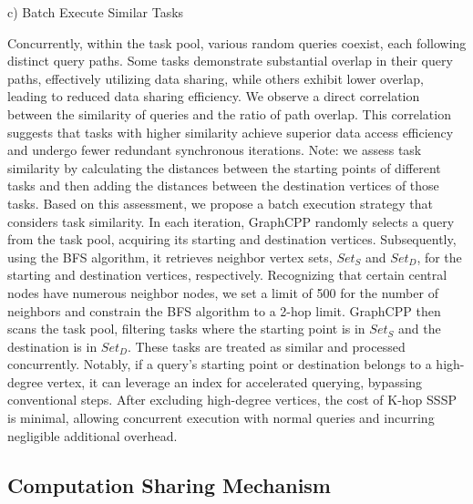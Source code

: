 \documentclass[lettersize,journal]{IEEEtran} %
\begin{document}
c) Batch Execute Similar Tasks

Concurrently, within the task pool, various random queries coexist, each following distinct query paths. Some tasks demonstrate substantial overlap in their query paths, effectively utilizing data sharing, while others exhibit lower overlap, leading to reduced data sharing efficiency. We observe a direct correlation between the similarity of queries and the ratio of path overlap. This correlation suggests that tasks with higher similarity achieve superior data access efficiency and undergo fewer redundant synchronous iterations. Note: we assess task similarity by calculating the distances between the starting points of different tasks and then adding the distances between the destination vertices of those tasks. Based on this assessment, we propose a batch execution strategy that considers task similarity. In each iteration, GraphCPP randomly selects a query from the task pool, acquiring its starting and destination vertices. Subsequently, using the BFS algorithm, it retrieves neighbor vertex sets, $Set_S$ and $Set_D$, for the starting and destination vertices, respectively. Recognizing that certain central nodes have numerous neighbor nodes, we set a limit of 500 for the number of neighbors and constrain the BFS algorithm to a 2-hop limit. GraphCPP then scans the task pool, filtering tasks where the starting point is in $Set_S$ and the destination is in $Set_D$. These tasks are treated as similar and processed concurrently. Notably, if a query's starting point or destination belongs to a high-degree vertex, it can leverage an index for accelerated querying, bypassing conventional steps. After excluding high-degree vertices, the cost of K-hop SSSP is minimal, allowing concurrent execution with normal queries and incurring negligible additional overhead.



\subsection{Computation Sharing Mechanism}
\end{document}
